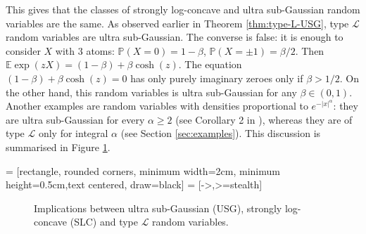 \documentclass[10pt]{article}
\newcommand{\E}{\mathbb{E}}
\newcommand{\1}{\textbf{1}}
\newcommand{\sL}{\mathscr{L}}
\newcommand{\p}[1]{\mathbb{P}\left( #1 \right)}
\theoremstyle{remark}
\theoremstyle{definition}
\begin{document}
This gives that the classes of strongly log-concave and ultra sub-Gaussian random variables are the same. As observed earlier in Theorem \ref{thm:type-L-USG}, type $\sL$ random variables are ultra sub-Gaussian. The converse is false: it is enough to consider $X$ with $3$ atoms: $\p{X=0} = 1-\beta$, $\p{X = \pm 1} = \beta/2$. Then $\E\exp(zX) = (1-\beta)+ \beta \cosh(z)$. The equation $(1-\beta)+ \beta \cosh(z)=0$ has only purely imaginary zeroes only if $\beta>1/2$. On the other hand, this random variables is ultra sub-Gaussian for any $\beta \in (0,1)$. Another examples are random variables with densities proportional to $e^{-|x|^\alpha}$: they are ultra sub-Gaussian for every $\alpha \geq 2$ (see Corollary 2 in \cite{NO}), whereas they are of type $\sL$ only for integral $\alpha$ (see Section \ref{sec:examples}). This discussion is summarised in Figure \ref{fig:dom}.


\usetikzlibrary{shapes.geometric, arrows}
 = [rectangle, rounded corners, minimum width=2cm, minimum height=0.5cm,text centered, draw=black]
 = [->,>=stealth]

\begin{figure}[ht]

\begin{center}
\end{center}
\caption{Implications between ultra sub-Gaussian (USG), strongly log-concave (SLC) and type $\sL$ random variables.}
\label{fig:dom}


\end{figure}
\end{document}
